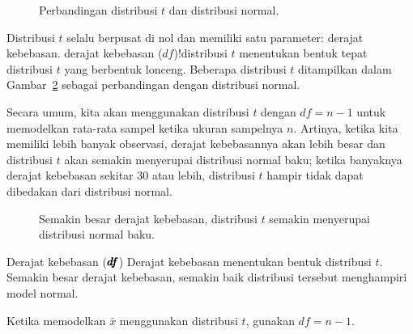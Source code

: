 \begin{figure}[h]
  \centering
  \caption{Perbandingan distribusi $t$
      dan distribusi normal.}
  \label{tDistCompareToNormalDist}
\end{figure}

Distribusi $t$ selalu berpusat di nol dan
memiliki satu parameter: derajat kebebasan.
    {derajat kebebasan ($df$)!distribusi $t$}
menentukan bentuk tepat distribusi $t$ yang berbentuk lonceng.
Beberapa distribusi $t$ ditampilkan dalam
Gambar~\ref{tDistConvergeToNormalDist}
sebagai perbandingan dengan distribusi normal.

Secara umum, kita akan menggunakan distribusi $t$
dengan $df = n - 1$ untuk memodelkan rata-rata sampel
ketika ukuran sampelnya $n$.
Artinya, ketika kita memiliki lebih banyak observasi,
derajat kebebasannya akan lebih besar dan
distribusi $t$ akan semakin menyerupai
distribusi normal baku;
ketika banyaknya derajat kebebasan sekitar 30 atau lebih,
distribusi $t$ hampir tidak dapat dibedakan
dari distribusi normal.

\begin{figure}[h]
  \centering
  \caption{Semakin besar derajat kebebasan,
      distribusi $t$ semakin menyerupai distribusi
      normal baku.}
  \label{tDistConvergeToNormalDist}
\end{figure}

\begin{onebox}{Derajat kebebasan
    ($\pmb{\MakeLowercase{df}}$)}
  Derajat kebebasan menentukan bentuk
  distribusi $t$.
  Semakin besar derajat kebebasan, semakin baik
  distribusi tersebut menghampiri model normal. \stdvspace{}

  Ketika memodelkan $\bar{x}$ menggunakan distribusi $t$,
  gunakan $df = n - 1$.
\end{onebox}

